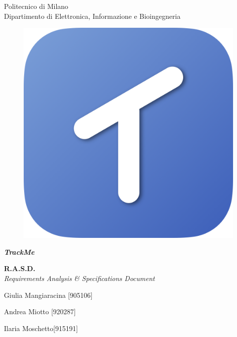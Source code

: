 \thispagestyle{empty}

\begin{center}

	\Huge Politecnico di Milano  \\   	\vspace{14pt}
    \Large Dipartimento di Elettronica, Informazione e Bioingegneria
    
    \vspace{30pt}
    
      \begin{figure}[h]
      	\centering
        \includegraphics[scale=0.2]{Pictures/Icon.png}
      \end{figure}
    
    \vspace{25pt}
    
    \Huge \textbf{\emph{TrackMe}} 
    \\
    \vspace{10pt}
    
   
    \huge \textbf{R.A.S.D.} \\
    \vspace{7pt}
    \Large \emph{Requirements Analysis \& Specifications Document} \\
    
    \vspace{110pt}
    
    \large Giulia Mangiaracina [905106]\\
    
    \vspace{5pt}
    
    \large Andrea Miotto [920287]\\
    
    \vspace{5pt}
    
    \large Ilaria Moschetto[915191]
    
    
\end{center}